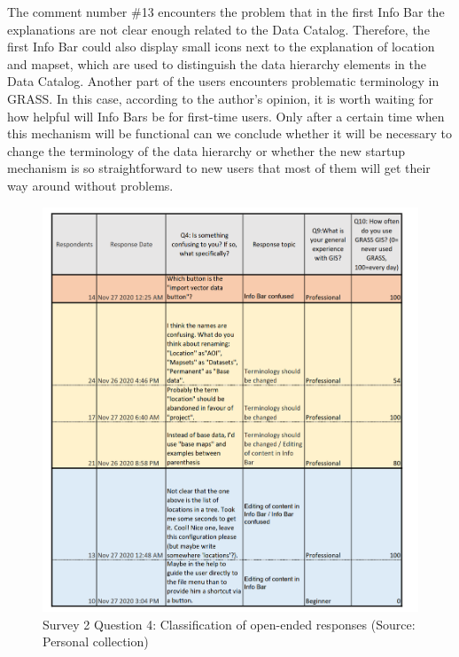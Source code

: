 \documentclass[a4paper,10pt,twoside]{article}
\begin{document}
\noindent The comment number \#13 encounters the problem that in the first Info Bar the explanations are not clear enough related to the Data Catalog. Therefore, the first Info Bar could also display small icons next to the explanation of location and mapset, which are used to distinguish the data hierarchy elements in the Data Catalog. Another part of the users encounters problematic terminology in GRASS. In this case, according to the author's opinion, it is worth waiting for how helpful will Info Bars be for first-time users. Only after a certain time when this mechanism will be functional can we conclude whether it will be necessary to change the terminology of the data hierarchy or whether the new startup mechanism is so straightforward to new users that most of them will get their way around without problems.

\vspace{0.3cm}
\begin{figure}[hbt!] 
\begin{center}
\includegraphics[width=16cm]{../surveys/analyzed_data/survey2_question4.png} 
\caption[Survey 2 Question 4: Classification of open-ended responses]{Survey 2 Question 4: Classification of open-ended responses (Source: Personal collection)}
\label{fig:survey2_question4}
\end{center}
\end{figure}
\end{document}
